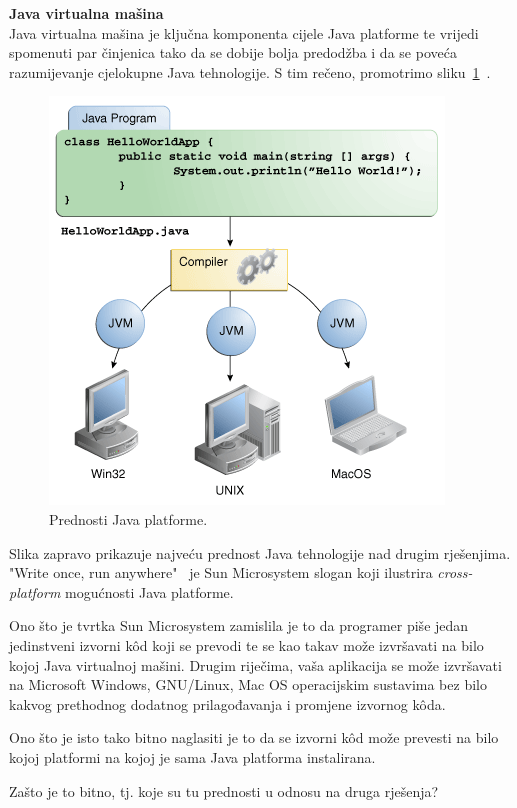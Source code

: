 \textbf{Java virtualna mašina}\\
Java virtualna mašina je ključna komponenta cijele Java platforme te vrijedi spomenuti par činjenica tako da se dobije bolja predodžba i da se poveća razumijevanje cjelokupne Java tehnologije. S tim rečeno, promotrimo sliku~\ref{fig:java_platform_benefits}~\cite{javatutorials}.

\begin{figure}[h!]
    \caption{Prednosti Java platforme.}
    \label{fig:java_platform_benefits}
    \centering
    \includegraphics[scale=0.6]{images/java_platform_benefits.png}
\end{figure}

Slika zapravo prikazuje najveću prednost Java tehnologije nad drugim rješenjima. "Write once, run anywhere"~\cite{writeoncerunanywhere} je Sun Microsystem slogan koji ilustrira \emph{cross-platform} mogućnosti Java platforme.

Ono što je tvrtka Sun Microsystem zamislila je to da programer piše jedan jedinstveni izvorni kôd koji se prevodi te se kao takav može izvršavati na bilo kojoj Java virtualnoj mašini. Drugim riječima, vaša aplikacija se može izvršavati na Microsoft Windows, GNU/Linux, Mac OS operacijskim sustavima bez bilo kakvog prethodnog dodatnog prilagođavanja i promjene izvornog kôda.

Ono što je isto tako bitno naglasiti je to da se izvorni kôd može prevesti na bilo kojoj platformi na kojoj je sama Java platforma instalirana.

Zašto je to bitno, tj. koje su tu prednosti u odnosu na druga rješenja?

